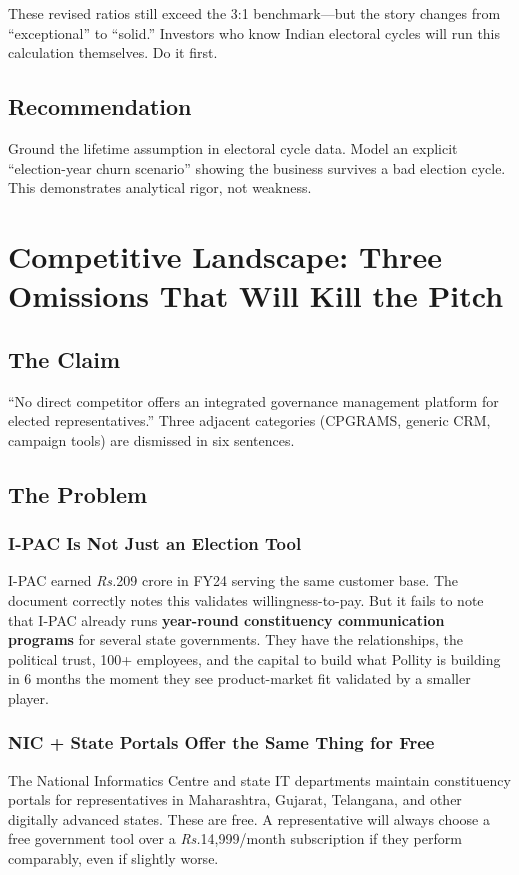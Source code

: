 \documentclass[12pt, a4paper]{article}
\newcommand{\rupee}{\textit{Rs.}}
\begin{document}
These revised ratios still exceed the 3:1 benchmark---but the story changes from ``exceptional'' to ``solid.'' Investors who know Indian electoral cycles will run this calculation themselves. Do it first.

\subsection{Recommendation}
Ground the lifetime assumption in electoral cycle data. Model an explicit ``election-year churn scenario'' showing the business survives a bad election cycle. This demonstrates analytical rigor, not weakness.

\newpage

\section{Competitive Landscape: Three Omissions That Will Kill the Pitch}

\subsection{The Claim}
``No direct competitor offers an integrated governance management platform for elected representatives.'' Three adjacent categories (CPGRAMS, generic CRM, campaign tools) are dismissed in six sentences.

\subsection{The Problem}

\subsubsection{I-PAC Is Not Just an Election Tool}
I-PAC earned \rupee{}209 crore in FY24 serving the same customer base. The document correctly notes this validates willingness-to-pay. But it fails to note that I-PAC already runs \textbf{year-round constituency communication programs} for several state governments. They have the relationships, the political trust, 100+ employees, and the capital to build what Pollity is building in 6 months the moment they see product-market fit validated by a smaller player.

\subsubsection{NIC + State Portals Offer the Same Thing for Free}
The National Informatics Centre and state IT departments maintain constituency portals for representatives in Maharashtra, Gujarat, Telangana, and other digitally advanced states. These are free. A representative will always choose a free government tool over a \rupee{}14,999/month subscription if they perform comparably, even if slightly worse.
\end{document}
